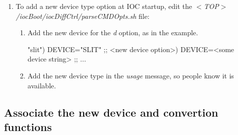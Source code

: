\documentclass[openany]{article}
\begin{document}
        \begin{enumerate}
            \item To add a new device type option at IOC startup, edit the \emph{$<$TOP$>$ /iocBoot/iocDiffCtrl/parseCMDOpts.sh} file:
            \begin{enumerate}
                \item Add the new device for the \emph{d} option, as in the example.
                \vspace{1mm}
                \begin{code}
"slit") DEVICE="SLIT" ;;
<new device option>) DEVICE=<some device string> ;;
...
                \end{code}
                \vspace{1mm}
                \item Add the new device type in the \emph{usage} message, so people know it is available.
            \end{enumerate}
        \end{enumerate}

    \subsection{Associate the new device and convertion functions}
\end{document}
